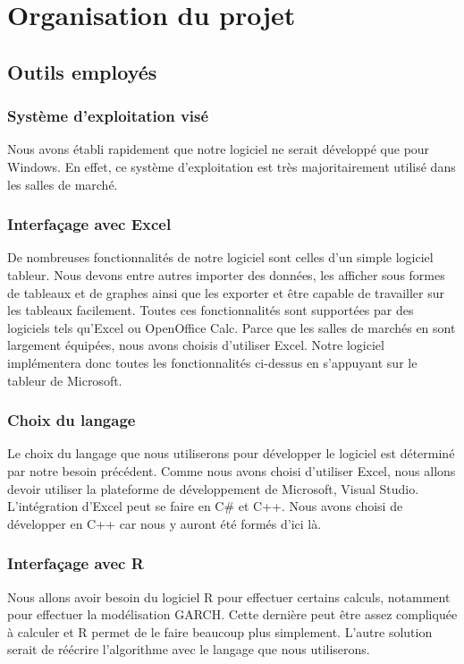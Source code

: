 \chapter{Organisation du projet}

\section{Outils employés}

\subsection{Système d’exploitation visé}
	Nous avons établi rapidement que notre logiciel ne serait développé que pour Windows. En effet, ce système d’exploitation est très majoritairement utilisé dans les salles de marché.


\subsection{Interfaçage avec Excel}
	De nombreuses fonctionnalités de notre logiciel sont celles d’un simple logiciel tableur. Nous devons entre autres importer des données, les afficher sous formes de tableaux et de graphes ainsi que les exporter et être capable de travailler sur les tableaux facilement. Toutes ces fonctionnalités sont supportées par des logiciels tels qu’Excel ou OpenOffice Calc.
	Parce que les salles de marchés en sont largement équipées, nous avons choisis d’utiliser Excel. Notre logiciel implémentera donc toutes les fonctionnalités ci-dessus en s’appuyant sur le tableur de Microsoft.


\subsection{Choix du langage}
	Le choix du langage que nous utiliserons pour développer le logiciel est déterminé par notre besoin précédent. Comme nous avons choisi d’utiliser Excel, nous allons devoir utiliser la plateforme de développement de Microsoft, Visual Studio. L’intégration d’Excel peut se faire en C\# et C++. Nous avons choisi de développer en C++ car nous y auront été formés d’ici là.


\subsection{Interfaçage avec R}
	Nous allons avoir besoin du logiciel R pour effectuer certains calculs, notamment pour effectuer la modélisation GARCH. Cette dernière peut être assez compliquée à calculer et R permet de le faire beaucoup plus simplement. L’autre solution serait de réécrire l’algorithme avec le langage que nous utiliserons.

